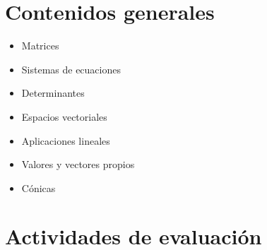 \documentclass[a4,11pt]{aleph-notas}
\begin{document}
\section{Contenidos generales} 

\begin{itemize}
\item 
    Matrices
\item 
    Sistemas de ecuaciones
\item 
    Determinantes
\item 
    Espacios vectoriales
\item 
    Aplicaciones lineales
\item 
    Valores y vectores propios
\item 
    Cónicas
\end{itemize}

\section{Actividades de evaluación} 
\end{document}
